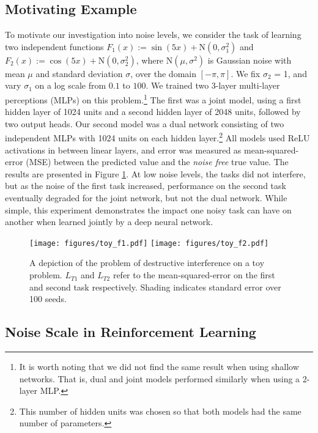 \documentclass{article}
\begin{document}
\subsection{Motivating Example}

To motivate our investigation into noise levels, we consider the task of learning two independent functions $F_1(x) := \sin(5x)+\text{N}(0, \sigma_1^2)$ and $F_2(x) := \cos(5x)+\text{N}(0, \sigma_2^2)$, where $\text{N}(\mu,\sigma^2)$ is Gaussian noise with mean $\mu$ and standard deviation $\sigma$,  over the domain $[-\pi, \pi]$. We fix $\sigma_2$ = 1, and vary $\sigma_1$ on a log scale from $0.1$ to $100$. We trained two 3-layer multi-layer perceptions (MLPs) on this problem.\footnote{It is worth noting that we did not find the same result when using shallow networks. That is, dual and joint models performed similarly when using a 2-layer MLP.}  The first was a joint model, using a first hidden layer of 1024 units and a second hidden layer of 2048 units, followed by two output heads. Our second model was a dual network consisting of two independent MLPs with 1024 units on each hidden layer.\footnote{This number of hidden units was chosen so that both models had the same number of parameters.} All models used ReLU activations in between linear layers, and error was measured as mean-squared-error (MSE) between the predicted value and the \textit{noise free} true value. The results are presented in Figure \ref{fig:toy_noise}. At low noise levels, the tasks did not interfere, but as the noise of the first task increased, performance on the second task eventually degraded for the joint network, but not the dual network. While simple, this experiment demonstrates the impact one noisy task can have on another when learned jointly by a deep neural network.

\begin{figure}[h]
    \centering
    \texttt{[image: figures/toy\_f1.pdf]}
    \texttt{[image: figures/toy\_f2.pdf]}
    \caption{A depiction of the problem of destructive interference on a toy problem. $L_{T1}$ and $L_{T2}$ refer to the mean-squared-error on the first and second task respectively. Shading indicates standard error over 100 seeds.}
    \label{fig:toy_noise}
\end{figure}

\subsection{Noise Scale in Reinforcement Learning}
\end{document}

